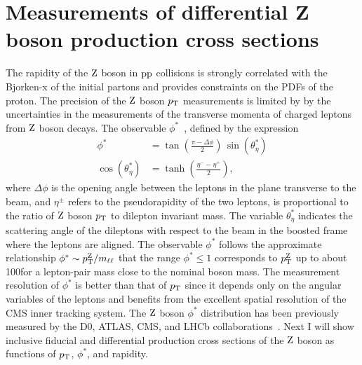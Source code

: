 \chapter{Measurements of differential Z boson production cross sections}

The rapidity of the $\mathrm{Z}$ boson in $\mathrm{p}\mathrm{p}$ collisions is strongly correlated 
with the Bjorken-x of the initial partons and provides constraints on the PDFs 
of the proton. The precision of the $\mathrm{Z}$ boson $p_{\mathrm{T}}$ measurements is 
limited by by the uncertainties in the measurements of the transverse momenta of 
charged leptons from $\mathrm{Z}$ boson decays. The observable $\phi^*$~\cite{Banfi:2010cf,Banfi:2012du,Marzani:2013nza}, defined by the expression
\begin{align}
\label{eq0}
\phi^*  &= \tan \left( \frac{\pi -\Delta\phi}{2} \right) \, \sin(\theta^*_\eta) \\
\nonumber
\cos(\theta^*_\eta)&=\tanh(\frac{\eta^- - \eta^+}{2}),
\end{align}
where $\Delta\phi$ is the opening angle between the leptons in the plane 
transverse to the beam, and $\eta^\pm$ refers to the pseudorapidity of the 
two leptons, is proportional to the ratio of $\mathrm{Z}$ boson $p_{\mathrm{T}}$ to dilepton 
invariant mass. 
The variable $\theta^*_\eta$ indicates the scattering angle of the dileptons 
with respect to the beam in the boosted frame where the leptons are aligned. 
The observable $\phi^*$ follows the approximate relationship 
$\phi^* \sim p_{\mathrm{T}}^{\mathrm{Z}} / m_{\ell\ell}$ that the range $\phi^* \le 1$ 
corresponds to $p_{\mathrm{T}}^{\mathrm{Z}}$ up to about 100\GeV for a lepton-pair mass close 
to the nominal \cPZ{} boson mass. The measurement resolution of $\phi^*$ is 
better than that of $p_{\mathrm{T}}$ since it depends only on the angular variables of 
the leptons and benefits from the  excellent spatial resolution of the CMS 
inner tracking system. The $\mathrm{Z}$ boson $\phi^*$ distribution has been 
previously measured by the D0, ATLAS, CMS, and LHCb 
collaborations~\cite{TevatronWZ:D0PhysRevLett2011_106,Aad:2015auj,Sirunyan:2017igm,Aaij:2016mgv}.     
Next I will show inclusive fiducial and differential production cross sections of 
the $\mathrm{Z}$ boson as functions of $p_{\mathrm{T}}$, $\phi^*$, and rapidity. 

